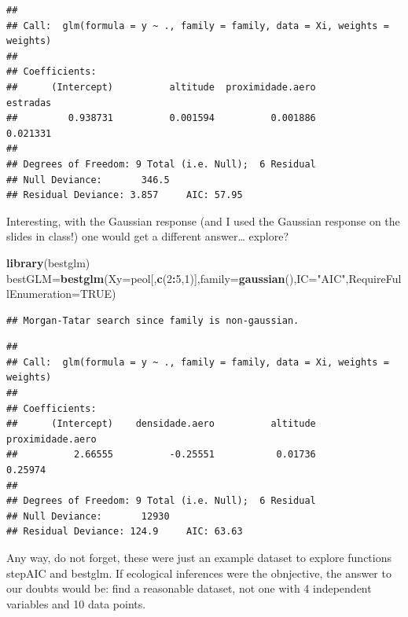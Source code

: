 \documentclass[
]{book}
\newenvironment{Shaded}{\begin{snugshade}}{\end{snugshade}}
\newcommand{\AttributeTok}[1]{\textcolor[rgb]{0.13,0.29,0.53}{#1}}
\newcommand{\ConstantTok}[1]{\textcolor[rgb]{0.56,0.35,0.01}{#1}}
\newcommand{\DecValTok}[1]{\textcolor[rgb]{0.00,0.00,0.81}{#1}}
\newcommand{\FunctionTok}[1]{\textcolor[rgb]{0.13,0.29,0.53}{\textbf{#1}}}
\newcommand{\NormalTok}[1]{#1}
\newcommand{\OtherTok}[1]{\textcolor[rgb]{0.56,0.35,0.01}{#1}}
\newcommand{\SpecialCharTok}[1]{\textcolor[rgb]{0.81,0.36,0.00}{\textbf{#1}}}
\newcommand{\StringTok}[1]{\textcolor[rgb]{0.31,0.60,0.02}{#1}}
\begin{document}
\begin{verbatim}
## 
## Call:  glm(formula = y ~ ., family = family, data = Xi, weights = weights)
## 
## Coefficients:
##      (Intercept)          altitude  proximidade.aero          estradas  
##         0.938731          0.001594          0.001886          0.021331  
## 
## Degrees of Freedom: 9 Total (i.e. Null);  6 Residual
## Null Deviance:       346.5 
## Residual Deviance: 3.857     AIC: 57.95
\end{verbatim}

Interesting, with the Gaussian response (and I used the Gaussian response on the slides in class!) one would get a different answer\ldots{} explore?

\begin{Shaded}
\begin{Highlighting}[]
\FunctionTok{library}\NormalTok{(bestglm)}
\NormalTok{bestGLM}\OtherTok{=}\FunctionTok{bestglm}\NormalTok{(}\AttributeTok{Xy=}\NormalTok{peol[,}\FunctionTok{c}\NormalTok{(}\DecValTok{2}\SpecialCharTok{:}\DecValTok{5}\NormalTok{,}\DecValTok{1}\NormalTok{)],}\AttributeTok{family=}\FunctionTok{gaussian}\NormalTok{(),}\AttributeTok{IC=}\StringTok{"AIC"}\NormalTok{,}\AttributeTok{RequireFullEnumeration=}\ConstantTok{TRUE}\NormalTok{)}
\end{Highlighting}
\end{Shaded}

\begin{verbatim}
## Morgan-Tatar search since family is non-gaussian.
\end{verbatim}

\begin{Shaded}
\end{Shaded}

\begin{verbatim}
## 
## Call:  glm(formula = y ~ ., family = family, data = Xi, weights = weights)
## 
## Coefficients:
##      (Intercept)    densidade.aero          altitude  proximidade.aero  
##          2.66555          -0.25551           0.01736           0.25974  
## 
## Degrees of Freedom: 9 Total (i.e. Null);  6 Residual
## Null Deviance:       12930 
## Residual Deviance: 124.9     AIC: 63.63
\end{verbatim}

Any way, do not forget, these were just an example dataset to explore functions stepAIC and bestglm. If ecological inferences were the obnjective, the answer to our doubts would be: find a reasonable dataset, not one with 4 independent variables and 10 data points.
\end{document}
